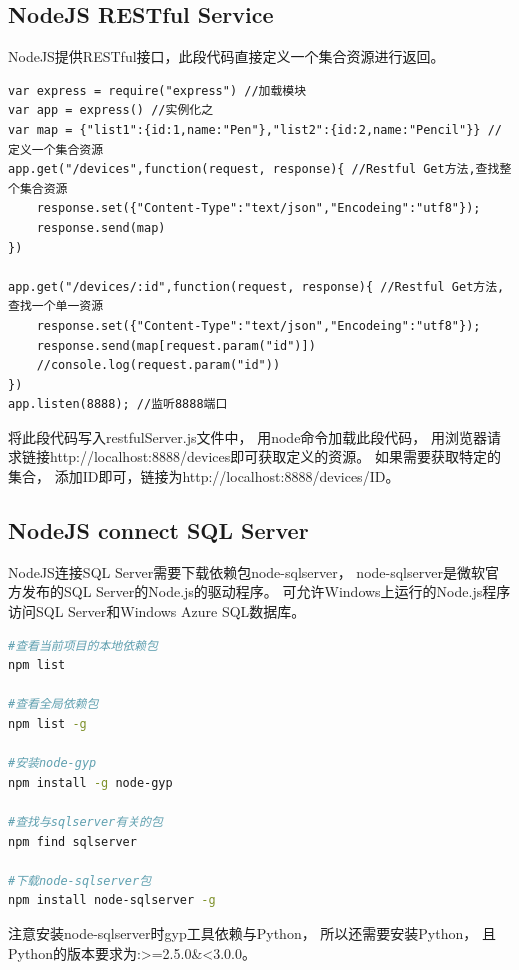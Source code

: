 \documentclass{book}
\begin{document}
\subsection{NodeJS RESTful Service}

NodeJS提供RESTful接口，此段代码直接定义一个集合资源进行返回。

\begin{lstlisting}[language=VBScript]
var express = require("express") //加载模块
var app = express() //实例化之
var map = {"list1":{id:1,name:"Pen"},"list2":{id:2,name:"Pencil"}} //定义一个集合资源
app.get("/devices",function(request, response){ //Restful Get方法,查找整个集合资源
    response.set({"Content-Type":"text/json","Encodeing":"utf8"});
    response.send(map)
})

app.get("/devices/:id",function(request, response){ //Restful Get方法,查找一个单一资源
    response.set({"Content-Type":"text/json","Encodeing":"utf8"});
    response.send(map[request.param("id")])
    //console.log(request.param("id"))
})
app.listen(8888); //监听8888端口
\end{lstlisting}

将此段代码写入restfulServer.js文件中，
用node命令加载此段代码，
用浏览器请求链接http://localhost:8888/devices即可获取定义的资源。
如果需要获取特定的集合，
添加ID即可，链接为http://localhost:8888/devices/{ID}。

\subsection{NodeJS connect SQL Server}

NodeJS连接SQL Server需要下载依赖包node-sqlserver，
node-sqlserver是微软官方发布的SQL Server的Node.js的驱动程序。
可允许Windows上运行的Node.js程序访问SQL Server和Windows Azure SQL数据库。

\begin{lstlisting}[language=Bash]
#查看当前项目的本地依赖包
npm list

#查看全局依赖包
npm list -g 

#安装node-gyp
npm install -g node-gyp

#查找与sqlserver有关的包
npm find sqlserver

#下载node-sqlserver包
npm install node-sqlserver -g
\end{lstlisting}

注意安装node-sqlserver时gyp工具依赖与Python，
所以还需要安装Python，
且Python的版本要求为:>=2.5.0\&<3.0.0。
\end{document}
